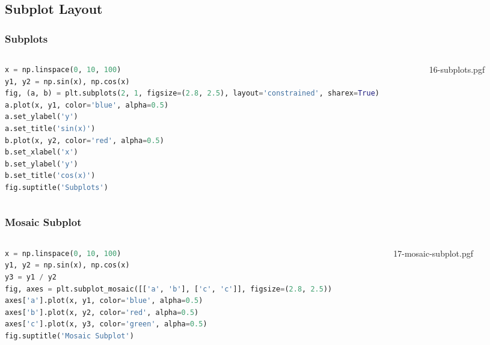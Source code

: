 \documentclass[beamer, en, version=2.0]{huangfusl-template}
\begin{document}
    \subsection{Subplot Layout}
    \begin{frame}[fragile]
        \frametitle{Subplots}

        \begin{columns}
        \begin{column}{0.5\textwidth}
\begin{lstlisting}[language=python, breaklines]
x = np.linspace(0, 10, 100)
y1, y2 = np.sin(x), np.cos(x)
fig, (a, b) = plt.subplots(2, 1, figsize=(2.8, 2.5), layout='constrained', sharex=True)
a.plot(x, y1, color='blue', alpha=0.5)
a.set_ylabel('y')
a.set_title('sin(x)')
b.plot(x, y2, color='red', alpha=0.5)
b.set_xlabel('x')
b.set_ylabel('y')
b.set_title('cos(x)')
fig.suptitle('Subplots')
\end{lstlisting}
        \end{column}
        \begin{column}{0.5\textwidth}
            {16-subplots.pgf}
        \end{column}
        \end{columns}
    \end{frame}
    \begin{frame}[fragile]
        \frametitle{Mosaic Subplot}

        \begin{columns}
        \begin{column}{0.5\textwidth}
\begin{lstlisting}[language=python, breaklines]
x = np.linspace(0, 10, 100)
y1, y2 = np.sin(x), np.cos(x)
y3 = y1 / y2
fig, axes = plt.subplot_mosaic([['a', 'b'], ['c', 'c']], figsize=(2.8, 2.5))
axes['a'].plot(x, y1, color='blue', alpha=0.5)
axes['b'].plot(x, y2, color='red', alpha=0.5)
axes['c'].plot(x, y3, color='green', alpha=0.5)
fig.suptitle('Mosaic Subplot')
\end{lstlisting}
        \end{column}
        \begin{column}{0.5\textwidth}
            {17-mosaic-subplot.pgf}
        \end{column}
        \end{columns}
    \end{frame}
\end{document}
